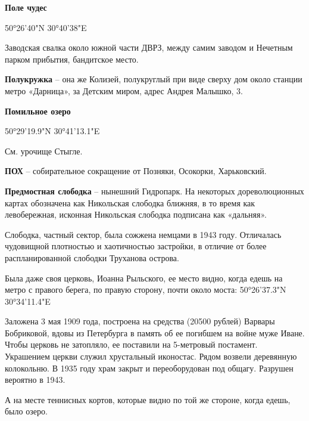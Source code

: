 \medskip


\textbf{Поле чудес}

50°26'40"N 30°40'38"E

Заводская свалка около южной части ДВРЗ, между самим заводом и Нечетным парком прибытия, бандитское место.\\

\medskip


\textbf{Полукружка} – она же Колизей, полукруглый при виде сверху дом около станции метро «Дарница», за Детским миром, адрес Андрея Малышко, 3.\\

\medskip


\textbf{Помильное озеро}

50°29'19.9"N 30°41'13.1"E

См. урочище Стыгле.\\

\medskip


\textbf{ПОХ} – собирательное сокращение от Позняки, Осокорки, Харьковский.\\

\medskip


\textbf{Предмостная слободка} – нынешний Гидропарк. На некоторых дореволюционных картах обозначена как Никольская слободка ближняя, в то время как левобережная, исконная Никольская слободка подписана как «дальняя».

Слободка, частный сектор, была сожжена немцами в 1943 году. Отличалась чудовищной плотностью и хаотичностью застройки, в отличие от более распланированной слободки Труханова острова. 

Была даже своя церковь, Иоанна Рыльского, ее место видно, когда едешь на метро с правого берега, по правую сторону, почти около моста: 50°26'37.3"N 30°34'11.4"E

Заложена 3 мая 1909 года, построена на средства  (20500 рублей) Варвары Бобриковой, вдовы из Петербурга в память об ее погибшем на войне муже Иване. Чтобы церковь не затопляло, ее поставили на 5-метровый постамент. Украшением церкви служил хрустальный иконостас. Рядом возвели деревянную колокольню. В 1935 году храм закрыт и переоборудован под общагу. Разрушен вероятно в 1943.

А на месте теннисных кортов, которые видно по той же стороне, когда едешь, было озеро.\\

\medskip



